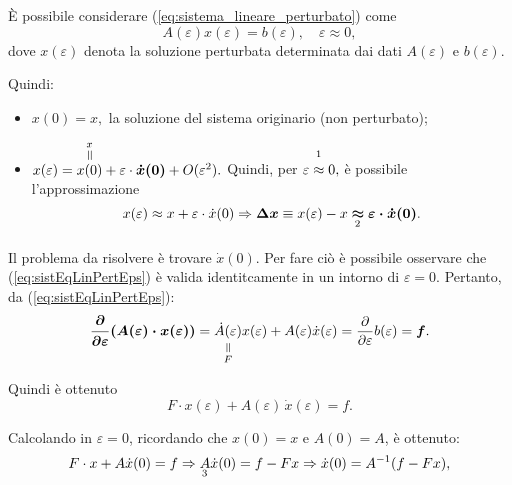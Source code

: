 \noindent È possibile considerare (\ref{eq:sistema_lineare_perturbato}) come
\begin{equation}\label{eq:sistEqLinPertEps}
    A(\varepsilon) x(\varepsilon)= b(\varepsilon),\quad \varepsilon\approx 0,
\end{equation}
dove $x(\varepsilon)$ denota la soluzione perturbata determinata dai dati $A(\varepsilon)$ e $b(\varepsilon)$.

Quindi:
\begin{itemize}
    \item $x(0)=x,$ la soluzione del sistema originario (non perturbato);
    \item $x(\varepsilon)=\equaltoup{x(0)}{x}+\varepsilon\cdot\boldsymbol{\dot x(0)}+O(\varepsilon^2).$ Quindi, per $\overset{\footnotemark}{\varepsilon\approx 0},$ è possibile l'approssimazione
    \begin{equation*}
        x(\varepsilon)\approx x+\varepsilon\cdot\dot x(0)\Rightarrow\boldsymbol{\Delta x}\equiv x(\varepsilon)-x\underset{\footnotemark}{\boldsymbol\approx}\boldsymbol{\varepsilon\cdot\dot x(0)}.
    \end{equation*}

\end{itemize}

\addtocounter{footnote}{-1}


Il problema da risolvere è trovare $\dot x(0)$. Per fare ciò è possibile osservare che (\ref{eq:sistEqLinPertEps}) è valida identitcamente in un intorno di $\varepsilon=0.$ Pertanto, da (\ref{eq:sistEqLinPertEps}):
\begin{equation*}
   \boldsymbol{\frac{\partial}{\partial\varepsilon}(A(\varepsilon)\cdot x(\varepsilon))}=\equalto{\dot A(\varepsilon)}{F}x(\varepsilon) + A(\varepsilon)\dot x(\varepsilon)=\frac{\partial}{\partial\varepsilon} b(\varepsilon)=\boldsymbol f.
\end{equation*}

Quindi è ottenuto
\begin{equation*}
 F\cdot x(\varepsilon) + A(\varepsilon)\,\dot x(\varepsilon)=f.
\end{equation*}


Calcolando in $\varepsilon=0$, ricordando che $x(0)=x$ e $A(0)=A$, è ottenuto: 
\begin{equation*}
    F\cdot x + A \dot x(0) = f \Rightarrow \underset{\footnotemark}{A} \dot x(0) = f - Fx\Rightarrow \dot x(0) = A^{-1}(f - Fx),
\end{equation*}

